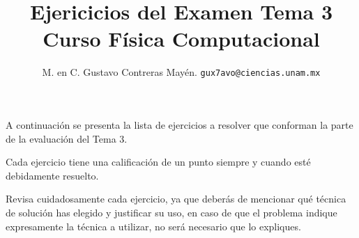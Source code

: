 
\usetikzlibrary{patterns, arrows}
\usetikzlibrary{decorations.text}
\usetikzlibrary{decorations.markings}
\usetikzlibrary{matrix}
\pgfplotsset{compat=1.18}

\title{Ejericicios del Examen Tema 3 \\ {\large Curso Física Computacional}}
\author{M. en C. Gustavo Contreras Mayén. \texttt{gux7avo@ciencias.unam.mx}}

\date{ }


\maketitle
\fontsize{14}{14}\selectfont

A continuación se presenta la lista de ejercicios a resolver que conforman la parte de la evaluación del Tema 3.
\par
Cada ejercicio tiene una calificación de un punto siempre y cuando esté debidamente resuelto.
\par
Revisa cuidadosamente cada ejercicio, ya que deberás de mencionar qué técnica de solución has elegido y justificar su uso, en caso de que el problema indique expresamente la técnica a utilizar, no será necesario que lo expliques.

